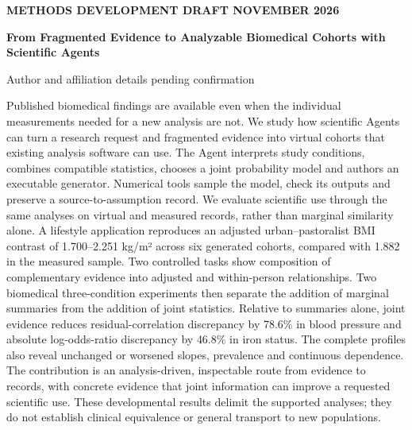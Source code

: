 \documentclass[11pt,letterpaper]{article}
\renewenvironment{abstract}{\small\par\noindent{\sffamily\bfseries\color{ink}Abstract}\quad\ignorespaces}{\par\medskip}
\begin{document}
\thispagestyle{plain}
{\sffamily\footnotesize\color{accent}\bfseries METHODS DEVELOPMENT DRAFT\quad\textbar{} NOVEMBER 2026\par}
\vspace{.7em}
{\raggedright\sffamily\bfseries\fontsize{24}{29}\selectfont\color{ink}From Fragmented Evidence to Analyzable Biomedical Cohorts with Scientific Agents\par}
\vspace{.5em}
{\small Author and affiliation details pending confirmation\par}
\vspace{.7em}
\begin{abstract}

Published biomedical findings are available even when the individual measurements needed for a new analysis are not. We study how scientific Agents can turn a research request and fragmented evidence into virtual cohorts that existing analysis software can use. The Agent interprets study conditions, combines compatible statistics, chooses a joint probability model and authors an executable generator. Numerical tools sample the model, check its outputs and preserve a source-to-assumption record. We evaluate scientific use through the same analyses on virtual and measured records, rather than marginal similarity alone. A lifestyle application reproduces an adjusted urban–\allowbreak{}pastoralist BMI contrast of 1.700–\allowbreak{}2.251 kg/\allowbreak{}m² across six generated cohorts, compared with 1.882 in the measured sample. Two controlled tasks show composition of complementary evidence into adjusted and within-person relationships. Two biomedical three-condition experiments then separate the addition of marginal summaries from the addition of joint statistics. Relative to summaries alone, joint evidence reduces residual-correlation discrepancy by 78.6\% in blood pressure and absolute log-odds-ratio discrepancy by 46.8\% in iron status. The complete profiles also reveal unchanged or worsened slopes, prevalence and continuous dependence. The contribution is an analysis-driven, inspectable route from evidence to records, with concrete evidence that joint information can improve a requested scientific use. These developmental results delimit the supported analyses; they do not establish clinical equivalence or general transport to new populations.

\end{abstract}

\end{document}
